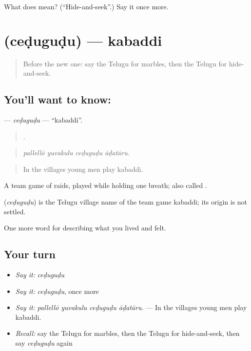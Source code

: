 \begin{tcolorbox}[breakable,colback=teal!4,colframe=teal!35!black,title={Before you move on}]
What does  mean? (\textquotedblleft{}Hide-and-seek\textquotedblright{}.) Say it once more.
\end{tcolorbox}
\section[\texorpdfstring{\te{చెడుగుడు} (ceḍuguḍu)}{చెడుగుడు (ceḍuguḍu)}]{ (ceḍuguḍu) — kabaddi}

\label{lesson:TE-C537-cedugudu}



\begin{quote}
Before the new one: say the Telugu for marbles, then the Telugu for hide-and-seek.
\end{quote}

\subsection*{You'll want to know: }
\textbf{} — \emph{ceḍuguḍu} — \textquotedblleft{}kabaddi\textquotedblright{}.

\begin{quote}
   .
\end{quote}

\begin{quote}
\emph{pallellō yuvakulu ceḍuguḍu āḍatāru.}
\end{quote}

\begin{quote}
In the villages young men play kabaddi.
\end{quote}

A team game of raids, played while holding one breath; also called .

\begin{cousinweb}
\textbf{} (\emph{ceḍuguḍu}) is the Telugu village name of the team game kabaddi; its origin is not settled.
\end{cousinweb}

\begin{grammarlens}[title={What you've built}]
One more word for describing what you lived and felt.
\end{grammarlens}

\subsection*{Your turn}
\begin{itemize}
\raggedright
  \item \emph{Say it:} \emph{ceḍuguḍu}
  \item \emph{Say it:} \emph{ceḍuguḍu}, once more
  \item \emph{Say it:} \emph{pallellō yuvakulu ceḍuguḍu āḍatāru.} — In the villages young men play kabaddi.
  \item \emph{Recall:} say the Telugu for marbles, then the Telugu for hide-and-seek, then say \emph{ceḍuguḍu} again
\end{itemize}

